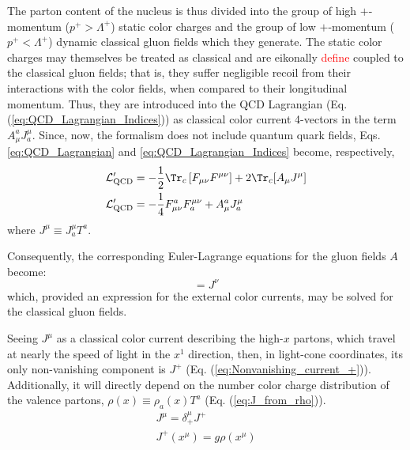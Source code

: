 
The parton content of the nucleus is thus divided into the group of high $+$-momentum ($p^+ > \Lambda^+$) static color charges and the group of low $+$-momentum ($p^+ < \Lambda^+$) dynamic classical gluon fields which they generate. The static color charges may themselves be treated as classical \cite{Albacete:2014fwa,McLerran:1993ni}
and are eikonally \textcolor{red}{define} coupled to the classical gluon fields; that is, they suffer negligible recoil from their interactions with the color fields, when compared to their longitudinal momentum.\cite{Gelis:2010nm} Thus, they are introduced into the \gls{QCD} Lagrangian (Eq. (\ref{eq:QCD_Lagrangian_Indices})) as classical color current 4-vectors in the term $A_\mu^a J^\mu_a$. Since, now, the formalism does not include quantum quark fields, Eqs. \ref{eq:QCD_Lagrangian} and \ref{eq:QCD_Lagrangian_Indices} become, respectively,%
\begin{align}
	\mathcal{L}_\text{QCD}' & = - \frac{1}{2} \Tr_c \left[ F_{\mu \nu} F^{\mu \nu} \right] + 2 \Tr_c [A_\mu J^\mu] \\
	\mathcal{L}_\text{QCD}' & =  - \frac{1}{4} F_{\mu \nu}^a F^{\mu \nu}_a + A_\mu^a J^\mu_a
	\label{eq:QCD_Lag_Current_indices}
\end{align}
where $J^\mu \equiv J^\mu_a T^a$.

Consequently, the corresponding Euler-Lagrange equations for the gluon fields $A$ become:
\begin{equation}
	[D_\mu, F^{\mu \nu}] = J^\nu
\end{equation}
which, provided an expression for the external color currents, may be solved for the classical gluon fields.

Seeing $J^\mu$ as a classical color current describing the high-$x$ partons, which travel at nearly the speed of light in the $x^1$ direction, then, in light-cone coordinates, its only non-vanishing component is $J^+$ (Eq. (\ref{eq:Nonvanishing_current_+})). Additionally, it will directly depend on the number color charge distribution of the valence partons, $\rho (x) \equiv \rho_a(x) T^a$ (Eq. (\ref{eq:J_from_rho})).
\begin{gather}
	J^\mu = \delta^\mu_+ J^+ \label{eq:Nonvanishing_current_+} \\
	J^+(x^\mu) = g \rho (x^\mu) \label{eq:J_from_rho}
\end{gather}

